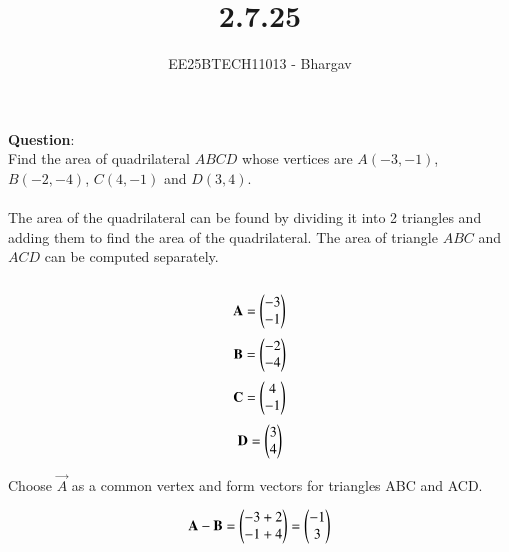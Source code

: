 \documentclass[journal]{IEEEtran}
\begin{document}

\vspace{3cm}

\title{2.7.25}
\author{EE25BTECH11013 - Bhargav}
\maketitle
{\let\newpage\relax\maketitle}

\renewcommand{\thefigure}{\theenumi}
\renewcommand{\thetable}{\theenumi}
\setlength{\intextsep}{10pt} %


\renewcommand{\thetable}{\theenumi}

\textbf{Question}:\\
Find the area of quadrilateral $ABCD$ whose vertices are  $A(-3,-1)$, $B(-2,-4)$, $C(4,-1)$ and $D(3,4)$. \\
\solution\\
The area of the quadrilateral can be found by dividing it into 2 triangles and adding them to find the area of the quadrilateral.
The area of triangle $ABC$ and $ACD$ can be computed separately. \\ \\

\begin{align}
\vec{A} = \myvec{-3 \\ -1}
\end{align}
\begin{align}
\vec{B} = \myvec{-2 \\ -4}
\end{align}
\begin{align}
\vec{C} = \myvec{4 \\ -1}
\end{align}
\begin{align}
\vec{D} = \myvec{3 \\ 4}
\end{align}



Choose \(\vec{A}\) as a common vertex and form vectors for triangles ABC and ACD.


\begin{align}
\vec{A}-\vec{B} 
= \myvec{-3+2 \\ -1+4} = \myvec{-1 \\ 3}
\end{align}
\end{document}

